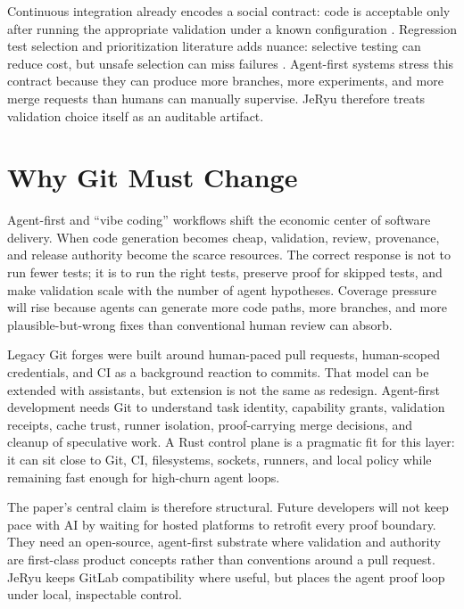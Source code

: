 \documentclass[conference]{IEEEtran}
\begin{document}
Continuous integration already encodes a social contract: code is acceptable only after running the appropriate validation under a known configuration \cite{continuous-integration}. Regression test selection and prioritization literature adds nuance: selective testing can reduce cost, but unsafe selection can miss failures \cite{regression-test-selection-survey,safe-regression-test-selection,test-prioritization}. Agent-first systems stress this contract because they can produce more branches, more experiments, and more merge requests than humans can manually supervise. JeRyu therefore treats validation choice itself as an auditable artifact.

\section{Why Git Must Change}
Agent-first and ``vibe coding'' workflows shift the economic center of software delivery. When code generation becomes cheap, validation, review, provenance, and release authority become the scarce resources. The correct response is not to run fewer tests; it is to run the right tests, preserve proof for skipped tests, and make validation scale with the number of agent hypotheses. Coverage pressure will rise because agents can generate more code paths, more branches, and more plausible-but-wrong fixes than conventional human review can absorb.

Legacy Git forges were built around human-paced pull requests, human-scoped credentials, and CI as a background reaction to commits. That model can be extended with assistants, but extension is not the same as redesign. Agent-first development needs Git to understand task identity, capability grants, validation receipts, cache trust, runner isolation, proof-carrying merge decisions, and cleanup of speculative work. A Rust control plane is a pragmatic fit for this layer: it can sit close to Git, CI, filesystems, sockets, runners, and local policy while remaining fast enough for high-churn agent loops.

The paper's central claim is therefore structural. Future developers will not keep pace with AI by waiting for hosted  platforms to retrofit every proof boundary. They need an open-source, agent-first substrate where validation and authority are first-class product concepts rather than conventions around a pull request. JeRyu keeps GitLab compatibility where useful, but places the agent proof loop under local, inspectable control.
\end{document}

